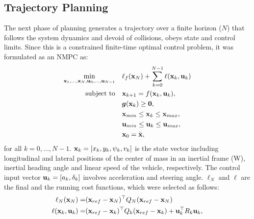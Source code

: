 \documentclass[letterpaper, 10 pt, conference]{ieeeconf}
\begin{document}
\subsection{Trajectory Planning}
\label{section:trajectoryplanning}
The next phase of planning generates a trajectory over a finite horizon ($N$) that follows the system dynamics and devoid of collisions, obeys state and control limits. Since this is a constrained finite-time optimal control problem, it was formulated as an NMPC as:
\begin{equation}
\label{NMPC_Formulation}
\begin{aligned}
\underset{\textbf{\text{x}}_1, ..., \textbf{\text{x}}_{N},\textbf{\text{u}}_0, ..., \textbf{\text{u}}_{N-1}}{\text{min}} \quad & \ell_f(\textbf{\text{x}}_N)+\sum_{k=0}^{N-1}\ell(\textbf{\text{x}}_k, \textbf{\text{u}}_k) \\
\text{subject to} \quad & \textbf{\text{x}}_{k+1} = f(\textbf{\text{x}}_k, \textbf{\text{u}}_k), \\ 
& \bm{g}(\textbf{\text{x}}_k)\geq \textbf{\text{0}}, \\
& \textbf{\text{x}}_{min} \leq \textbf{\text{x}}_k \leq \textbf{\text{x}}_{max}, \\
& \textbf{\text{u}}_{min} \leq \textbf{\text{u}}_k \leq \textbf{\text{u}}_{max}, \\
& \textbf{\text{x}}_0 = \bar{\textbf{\text{x}}},
\end{aligned}
\end{equation}
for all $k=0,..., N-1$. $\textbf{\text{x}}_k = [x_k, y_k, \psi_k, v_k]$ is the state vector including longitudinal and lateral positions of the center of mass in an inertial frame (W), inertial heading angle and linear speed of the vehicle, respectively. The control input vector $\textbf{\text{u}}_k = [a_k, \delta_k]$ involves acceleration and steering angle. $\ell_N$ and $\ell$ are the final and the running cost functions, which were selected as follows:
\begin{equation}
\label{Cost_Functions}
\begin{aligned}
\ell_N(\textbf{\text{x}}_N) = & (\textbf{\text{x}}_{ref}-\textbf{\text{x}}_N)^{\top}Q_N(\textbf{\text{x}}_{ref}-\textbf{\text{x}}_N) \\
\ell(\textbf{\text{x}}_k, \textbf{\text{u}}_k) = & (\textbf{\text{x}}_{ref}-\textbf{\text{x}}_k)^{\top}Q_k(\textbf{\text{x}}_{ref}-\textbf{\text{x}}_k) + \textbf{\text{u}}_k^{\top}R_k\textbf{\text{u}}_k,
\end{aligned}
\end{equation}
\end{document}
